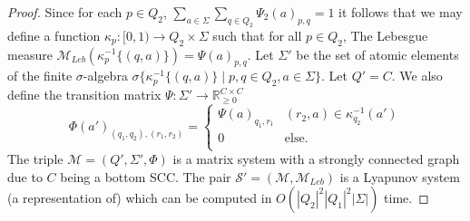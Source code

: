 \documentclass[a4paper,UKenglish,cleveref, autoref,mathscr]{lipics-v2019}
\newcommand{\RR}{\mathbb{R}}
\newcommand{\MM}{\mathscr{M}}
\newcommand{\1}{\mathbbm{1}}
\newcommand{\MLeb}{\MM_{\mathit{Leb}}}
\begin{document}
\fromgentonongen*

\begin{proof}
Since for each $p \in Q_2$, $\sum_{a \in \Sigma} \sum_{q \in Q_2} \Psi_2(a)_{p,q} = 1$ it follows that we may define a function $\kappa_p : [0,1) \rightarrow Q_2 \times \Sigma$ such that for all $p \in Q_2$, The Lebesgue measure $\MLeb(\kappa_p^{-1}\{(q, a)\}) = \Psi(a)_{p,q}$.
Let $\Sigma'$ be the set of atomic elements of the finite $\sigma$-algebra $\sigma\{\kappa_p^{-1}\{(q, a)\} \mid p,q \in Q_2, a \in \Sigma\}$. Let $Q' = C$. We also define the transition matrix $\Psi : \Sigma' \rightarrow \RR_{\geq 0}^{C \times C}$
\begin{equation*}
\Phi(a')_{(q_1,q_2),(r_1,r_2)} = \begin{cases}
\Psi(a)_{q_1, r_1} & (r_2, a) \in \kappa_{q_2}^{-1}(a') \\
0 & \text{else}. \\
\end{cases}
\end{equation*} 
The triple $\mathcal{M} = (Q', \Sigma', \Phi)$ is a matrix system with a strongly connected graph due to $C$ being a bottom SCC. The pair $\mathcal{S'} = (\mathcal{M}, \MLeb)$ is a Lyapunov system (a representation of) which can be computed in $O(|Q_2|^2|Q_1|^2 |\Sigma|)$ time. 


\end{proof}
\end{document}
